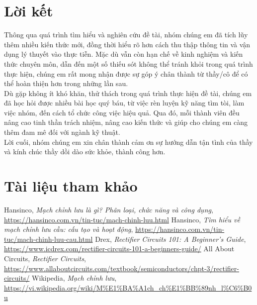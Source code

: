 \documentclass[a4paper,15pt]{article}
\begin{document}
\section{Lời kết}
Thông qua quá trình tìm hiểu và nghiên cứu đề tài, nhóm chúng em đã tích lũy thêm nhiều kiến thức mới, đồng thời hiểu rõ hơn cách thu thập thông tin và vận dụng lý thuyết vào thực tiễn. Mặc dù vẫn còn hạn chế về kinh nghiệm và kiến thức chuyên môn, dẫn đến một số thiếu sót không thể tránh khỏi trong quá trình thực hiện, chúng em rất mong nhận được sự góp ý chân thành từ thầy/cô để có thể hoàn thiện hơn trong những lần sau.\\
Dù gặp không ít khó khăn, thử thách trong quá trình thực hiện đề tài, chúng em đã học hỏi được nhiều bài học quý báu, từ việc rèn luyện kỹ năng tìm tòi, làm việc nhóm, đến cách tổ chức công việc hiệu quả. Qua đó, mỗi thành viên đều nâng cao tinh thần trách nhiệm, nâng cao kiến thức và giúp cho chúng em càng thêm đam mê đối với ngành kỹ thuật.\\
Lời cuối, nhóm chúng em xin chân thành cảm ơn sự hướng dẫn tận tình của thầy và kính chúc thầy dồi dào sức khỏe, thành công hơn.
\newpage
\section{Tài liệu tham khảo}
\begin{thebibliography}{9}
Hansinco,
\textit{Mạch chỉnh lưu là gì? Phân loại, chức năng và công dụng},
\url{https://hansinco.com.vn/tin-tuc/mach-chinh-luu.html}
Hansinco,
\textit{Tìm hiểu về mạch chỉnh lưu cầu: cấu tạo và hoạt động},
\url{https://hansinco.com.vn/tin-tuc/mach-chinh-luu-cau.html}
Drex,
\textit{Rectifier Circuits 101: A Beginner’s Guide},
\url{https://www.icdrex.com/rectifier-circuits-101-a-beginners-guide/}
All About Circuits,
\textit{Rectifier Circuits},
\url{https://www.allaboutcircuits.com/textbook/semiconductors/chpt-3/rectifier-circuits/}
Wikipedia,
\textit{Mạch chỉnh lưu},
\url{https://vi.wikipedia.org/wiki/M%E1%BA%A1ch_ch%E1%BB%89nh_l%C6%B0u}
\end{thebibliography}
\end{document}
